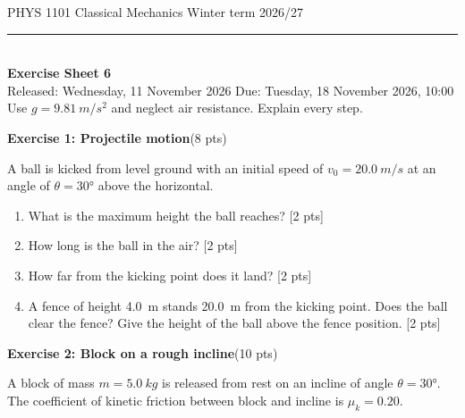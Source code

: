 \documentclass[11pt,a4paper]{article}
\newcommand{\exercise}[3]{\bigskip\par\noindent\textbf{Exercise #1: #2}\hfill(#3 pts)\par\nopagebreak\smallskip}
\newcommand{\pts}[1]{\hfill[#1 pts]}
\begin{document}
{\small PHYS 1101 \textperiodcentered{} Classical Mechanics \hfill Winter term 2026/27}\\[-0.4em]
\rule{\linewidth}{0.6pt}\\[0.5em]
{\Large\bfseries Exercise Sheet 6}\\[0.4em]
Released: Wednesday, 11 November 2026 \hfill Due: Tuesday, 18 November 2026, 10:00\\[0.3em]
{\small Use $g = \qty{9.81}{m/s^2}$ and neglect air resistance. Explain every step.}

\exercise{1}{Projectile motion}{8}
A ball is kicked from level ground with an initial speed of $v_0 = \qty{20.0}{m/s}$ at an angle of
$\theta = \ang{30}$ above the horizontal.
\begin{enumerate}
  \item What is the maximum height the ball reaches? \pts{2}
  \item How long is the ball in the air? \pts{2}
  \item How far from the kicking point does it land? \pts{2}
  \item A fence of height \qty{4.0}{m} stands \qty{20.0}{m} from the kicking point. Does the ball clear
        the fence? Give the height of the ball above the fence position. \pts{2}
\end{enumerate}

\exercise{2}{Block on a rough incline}{10}
A block of mass $m = \qty{5.0}{kg}$ is released from rest on an incline of angle $\theta = \ang{30}$.
The coefficient of kinetic friction between block and incline is $\mu_k = 0.20$.

\begin{center}
\end{center}
\end{document}
